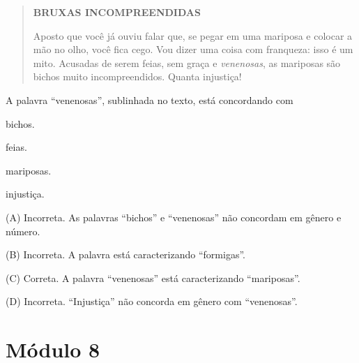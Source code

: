 \begin{escolha}
\begin{escolha}
{\begin{escolha}
\begin{quote}
\textbf{BRUXAS INCOMPREENDIDAS}

Aposto que você já ouviu falar que, se pegar em uma mariposa e colocar a
mão no olho, você fica cego. Vou dizer uma coisa com franqueza: isso é
um mito. Acusadas de serem feias, sem graça e \emph{venenosas}, as
mariposas são bichos muito incompreendidos. Quanta injustiça!
\end{quote}


A palavra ``venenosas'', sublinhada no texto, está concordando com

\begin{escolha}
\item bichos.

\item feias.

\item mariposas.

\item injustiça.
\end{escolha}


(A) Incorreta. As palavras ``bichos'' e ``venenosas'' não concordam em
gênero e número.

(B) Incorreta. A palavra está caracterizando ``formigas''.

(C) Correta. A palavra ``venenosas'' está caracterizando ``mariposas''.

(D) Incorreta. ``Injustiça'' não concorda em gênero com ``venenosas''.

\chapter{Módulo 8}




\end{escolha}}
\end{escolha}
\end{escolha}
